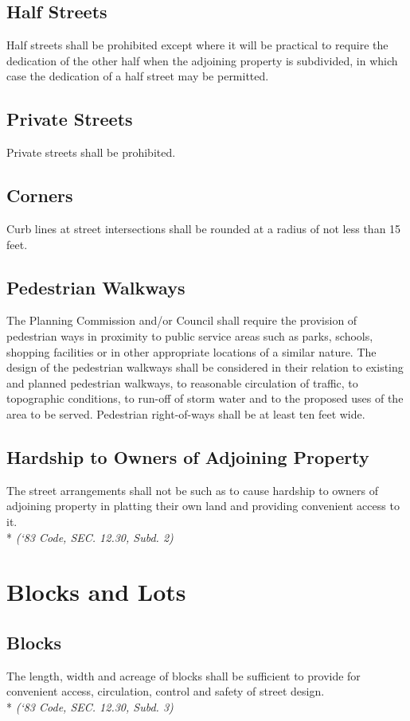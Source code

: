 \subsection{Half Streets}
Half streets shall be prohibited except where it will be practical to require the dedication of the other half when the adjoining property is subdivided, in which case the dedication of a half street may be permitted.
\subsection{Private Streets}
Private streets shall be prohibited.
\subsection{Corners}
Curb lines at street intersections shall be rounded at a radius of not less than 15 feet.
\subsection{Pedestrian Walkways}
The Planning Commission and/or Council shall require the provision of pedestrian ways in proximity to public service areas such as parks, schools, shopping facilities or in other appropriate locations of a similar nature. The design of the pedestrian walkways shall be considered in their relation to existing and planned pedestrian walkways, to reasonable circulation of traffic, to topographic conditions, to run-off of storm water and to the proposed uses of the area to be served.  Pedestrian right-of-ways shall be at least ten feet wide.
\subsection{Hardship to Owners of Adjoining Property}
The street arrangements shall not be such as to cause hardship to owners of adjoining property in platting their own land and providing convenient access to it.\\*
\emph{(‘83 Code, SEC. 12.30, Subd. 2)}
\section{Blocks and Lots}
\subsection{Blocks}
The length, width and acreage of blocks shall be sufficient to provide for convenient access, circulation, control and safety of street design.\\*
\emph{(‘83 Code, SEC. 12.30, Subd. 3)}
